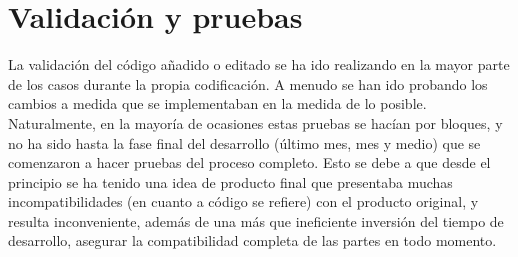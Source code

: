 \documentclass[a4paper, 12pt]{book}
\begin{document}
 




\cleardoublepage
\chapter{Validación y pruebas}
\label{chap:experimentos}


La validación del código añadido o editado se ha ido realizando en la mayor parte de los casos durante la propia codificación. A menudo se han ido probando los cambios a medida que se implementaban en la medida de lo posible. Naturalmente, en la mayoría de ocasiones estas pruebas se hacían por bloques, y no ha sido hasta la fase final del desarrollo (último mes, mes y medio) que se comenzaron a hacer pruebas del proceso completo. Esto se debe a que desde el principio se ha tenido una idea de producto final que presentaba muchas incompatibilidades (en cuanto a código se refiere) con el producto original, y resulta inconveniente, además de una más que ineficiente inversión del tiempo de desarrollo, asegurar la compatibilidad completa de las partes en todo momento.
\end{document}
